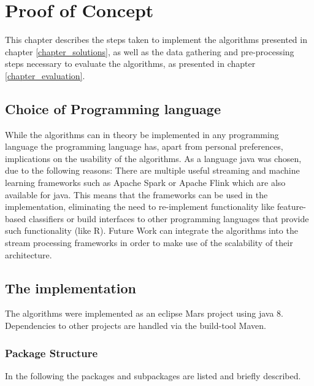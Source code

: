 \chapter{Proof of Concept}
\label{chapter_proofOfConcept}

\ifpdf
    \graphicspath{{Chapter5/Figs/Raster/}{Chapter5/Figs/PDF/}{Chapter5/Figs/}}
\else
    \graphicspath{{Chapter5/Figs/Vector/}{Chapter5/Figs/}}
\fi

This chapter describes the steps taken to implement the algorithms presented in chapter \ref{chapter_solutions}, as well as the data gathering and pre-processing steps necessary to evaluate the algorithms, as presented in chapter \ref{chapter_evaluation}.

\section{Choice of Programming language}
While the algorithms can in theory be implemented in any programming language the programming language has, apart from personal preferences, implications on the usability of the algorithms. As a language java was chosen, due to the following reasons: There are multiple useful streaming and machine learning frameworks such as Apache Spark \cite{meng2016mllib} or Apache Flink \cite{carbone2015apache} which are also available for java. This means that the frameworks can be used in the implementation, eliminating the need to re-implement functionality like feature-based classifiers or build interfaces to other programming languages that provide such functionality (like R). Future Work can integrate the algorithms into the stream processing frameworks in order to make use of the scalability of their architecture.

\section{The implementation}

The algorithms were implemented as an eclipse Mars project using java 8. Dependencies to other projects are handled via the build-tool Maven. 

\subsection{Package Structure}

In the following the packages and subpackages are listed and briefly described.

